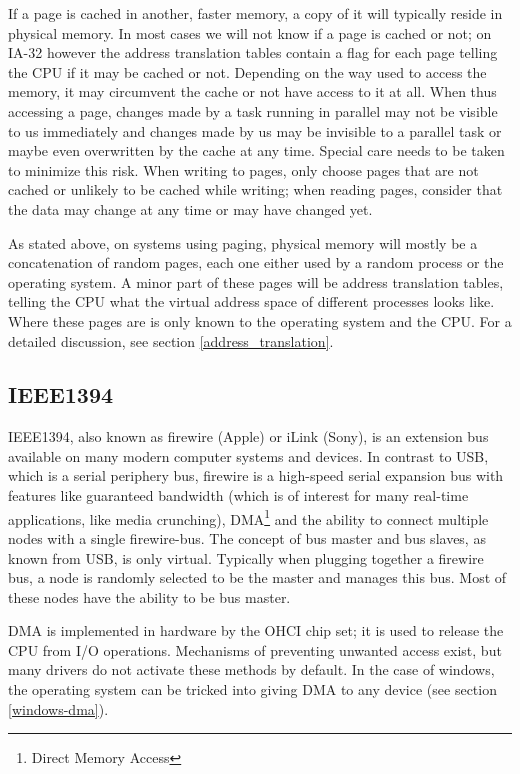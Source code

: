 If a page is cached in another, faster memory, a copy of it will typically
reside in physical memory. In most cases we will not know if a page is cached or
not; on IA-32 however the address translation tables contain a flag for each
page telling the CPU if it may be cached or not. Depending on the way used to
access the memory, it may circumvent the cache or not have access to it at all.
When thus accessing a page, changes made by a task running in parallel may not
be visible to us immediately and changes made by us may be invisible to a
parallel task or maybe even overwritten by the cache at any time. Special care
needs to be taken to minimize this risk. When writing to pages, only choose
pages that are not cached or unlikely to be cached while writing; when reading
pages, consider that the data may change at any time or may have changed yet.

As stated above, on systems using paging, physical memory will mostly be a
concatenation of random pages, each one either used by a random process or the
operating system. A minor part of these pages will be address translation
tables, telling the CPU what the virtual address space of different processes
looks like. Where these pages are is only known to the operating system and the
CPU.  For a detailed discussion, see section \ref{address_translation}.



\subsection{IEEE1394}

IEEE1394, also known as \epsfysize 0.3cm 
firewire (Apple) or iLink (Sony), is an extension bus available on many modern
computer systems and devices.  In contrast to USB, which is a serial periphery
bus, firewire is a high-speed serial expansion bus with features like guaranteed
bandwidth (which is of interest for many real-time applications, like media
crunching), DMA\footnote{Direct Memory Access} and the ability to connect
multiple nodes with a single firewire-bus.  The concept of bus master and bus
slaves, as known from USB, is only virtual.  Typically when plugging together a
firewire bus, a node is randomly selected to be the master and manages this bus.
Most of these nodes have the ability to be bus master.

DMA is implemented in hardware by the OHCI chip set; it is used to release the
CPU from I/O operations. Mechanisms of preventing unwanted access exist, but
many drivers do not activate these methods by default. In the case of windows,
the operating system can be tricked into giving DMA to any device (see section
\ref{windows-dma}).


